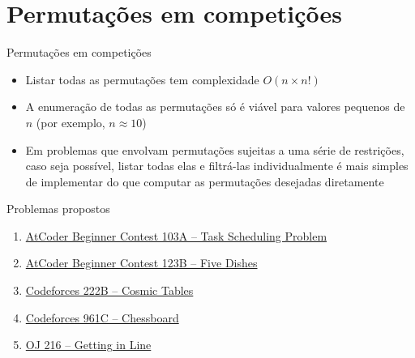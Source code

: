 \section{Permutações em competições}

\begin{frame}[fragile]{Permutações em competições}

    \begin{itemize}
        \item Listar todas as permutações tem complexidade $O(n\times n!)$

        \item A enumeração de todas as permutações só é viável para valores pequenos de $n$ (por exemplo, 
            $n \approx 10$) 

        \item Em problemas que envolvam permutações sujeitas a uma série de restrições, caso seja possível, listar 
            todas elas e filtrá-las individualmente é mais simples de implementar do que computar as permutações 
            desejadas diretamente
    \end{itemize}

\end{frame}

\begin{frame}[fragile]{Problemas propostos}

    \begin{enumerate}
        \item \href{https://atcoder.jp/contests/abc103/tasks/abc103_a}{AtCoder Beginner Contest 103A -- Task Scheduling Problem}

        \item \href{https://atcoder.jp/contests/abc123/tasks/abc123_b}{AtCoder Beginner Contest 123B -- Five Dishes}
        \item \href{https://codeforces.com/problemset/problem/222/B}{Codeforces 222B -- Cosmic Tables}
        \item \href{https://codeforces.com/problemset/problem/961/C}{Codeforces 961C -- Chessboard}

        \item \href{https://onlinejudge.org/index.php?option=com_onlinejudge&Itemid=8&page=show_problem&category=0&problem=152&mosmsg=Submission+received+with+ID+26304411}{OJ 216 -- Getting in Line}
    \end{enumerate}

\end{frame}
